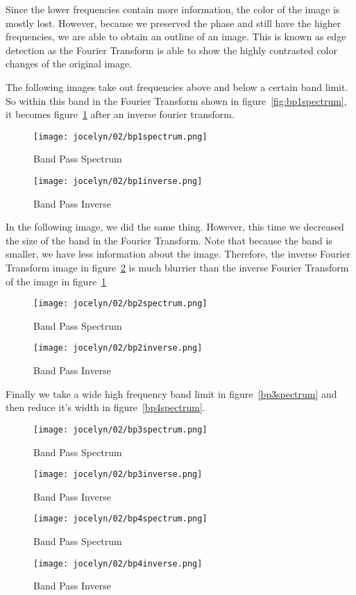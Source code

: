 \documentclass [../article.tex]{subfiles}
\begin{document}
  Since the lower frequencies contain more information, the color of
  the image is mostly lost.  However, because we preserved the phase
  and still have the higher frequencies, we are able to obtain an
  outline of an image.  This is known as edge detection as the
  Fourier Transform is able to show the highly contrasted color
  changes of the original image.

  The following images take out frequencies above and below a
  certain band limit.  So within this band in the Fourier
  Transform shown in figure~\ref{fig:bp1spectrum}, it becomes
  figure~\ref{fig:bp1inverse} after an inverse fourier transform.
  \begin{figure}[!htb]
      \texttt{[image: jocelyn/02/bp1spectrum.png]}
      \caption{Band Pass Spectrum}
      \label{fig:bp1spectrum}
    \endminipage\hfill
      \texttt{[image: jocelyn/02/bp1inverse.png]}
      \caption{Band Pass Inverse}
      \label{fig:bp1inverse}
    \endminipage
  \end{figure}

  In the following image, we did the same thing.  However, this time
  we decreased the size of the band in the Fourier Transform.  Note
  that because the band is smaller, we have less information about
  the image.  Therefore, the inverse Fourier Transform image in
  figure~\ref{fig:bp2inverse}
  is much blurrier than the inverse Fourier Transform of the image
  in figure~\ref{fig:bp1inverse}
  \begin{figure}[!htb]
      \texttt{[image: jocelyn/02/bp2spectrum.png]}
      \caption{Band Pass Spectrum}
      \label{fig:bp2spectrum}
    \endminipage\hfill
      \texttt{[image: jocelyn/02/bp2inverse.png]}
      \caption{Band Pass Inverse}
      \label{fig:bp2inverse}
    \endminipage
  \end{figure}

  Finally we take a wide high frequency band limit in
  figure~\ref{bp3spectrum} and then reduce it's width
  in figure~\ref{bp4spectrum}.
  \begin{figure}[!htb]
      \texttt{[image: jocelyn/02/bp3spectrum.png]}
      \caption{Band Pass Spectrum}
      \label{fig:bp3spectrum}
    \endminipage\hfill
      \texttt{[image: jocelyn/02/bp3inverse.png]}
      \caption{Band Pass Inverse}
      \label{fig:bp3inverse}
    \endminipage
  \end{figure}
  \begin{figure}[!htb]
      \texttt{[image: jocelyn/02/bp4spectrum.png]}
      \caption{Band Pass Spectrum}
      \label{fig:bp4spectrum}
    \endminipage\hfill
      \texttt{[image: jocelyn/02/bp4inverse.png]}
      \caption{Band Pass Inverse}
      \label{fig:bp4inverse}
    \endminipage
  \end{figure}
   
\end{document}

